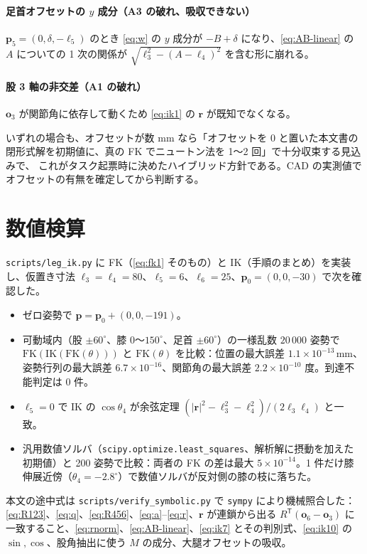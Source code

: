 \documentclass[a4paper,11pt]{ltjsarticle}
\newcommand{\bp}{\boldsymbol{p}}\newcommand{\bo}{\boldsymbol{o}}\newcommand{\br}{\boldsymbol{r}}
\newcommand{\T}{^{\mathsf T}}
\begin{document}
\paragraph{足首オフセットの $y$ 成分（A3 の破れ、吸収できない）}
$\bp_5=(0,\delta,-\ell_5)$ のとき \eqref{eq:w} の $y$ 成分が $-B+\delta$ になり、\eqref{eq:AB-linear} の $A$ についての 1 次の関係が $\sqrt{\ell_3^2-(A-\ell_4)^2}$ を含む形に崩れる。

\paragraph{股 3 軸の非交差（A1 の破れ）}
$\bo_3$ が関節角に依存して動くため \eqref{eq:ik1} の $\br$ が既知でなくなる。

いずれの場合も、オフセットが数 mm なら「オフセットを 0 と置いた本文書の閉形式解を初期値に、真の FK でニュートン法を 1〜2 回」で十分収束する見込みで、
これがタスク起票時に決めたハイブリッド方針である。CAD の実測値でオフセットの有無を確定してから判断する。

\section{数値検算}\label{sec:numeric}
\texttt{scripts/leg\_ik.py} に FK（\eqref{eq:fk1} そのもの）と IK（手順のまとめ）を実装し、仮置き寸法 $\ell_3=\ell_4=80$、$\ell_5=6$、$\ell_6=25$、$\bp_0=(0,0,-30)$ で次を確認した。
\begin{itemize}
\item ゼロ姿勢で $\bp=\bp_0+(0,0,-191)$。
\item 可動域内（股 $\pm60^\circ$、膝 $0$〜$150^\circ$、足首 $\pm60^\circ$）の一様乱数 $20\,000$ 姿勢で $\mathrm{FK}(\mathrm{IK}(\mathrm{FK}(\theta)))$ と $\mathrm{FK}(\theta)$ を比較：位置の最大誤差 $1.1\times10^{-13}\,\mathrm{mm}$、姿勢行列の最大誤差 $6.7\times10^{-16}$、関節角の最大誤差 $2.2\times10^{-10}$ 度。到達不能判定は 0 件。
\item $\ell_5=0$ で IK の $\cos\theta_4$ が余弦定理 $(|\br|^2-\ell_3^2-\ell_4^2)/(2\ell_3\ell_4)$ と一致。
\item 汎用数値ソルバ（\texttt{scipy.optimize.least\_squares}、解析解に摂動を加えた初期値）と 200 姿勢で比較：両者の FK の差は最大 $5\times10^{-14}$。1 件だけ膝伸展近傍（$\theta_4=-2.8^\circ$）で数値ソルバが反対側の膝の枝に落ちた。
\end{itemize}
本文の途中式は \texttt{scripts/verify\_symbolic.py} で \texttt{sympy} により機械照合した：\eqref{eq:R123}、\eqref{eq:q}、\eqref{eq:R456}、\eqref{eq:a}--\eqref{eq:r}、$\br$ が連鎖から出る $R\T(\bo_6-\bo_3)$ に一致すること、\eqref{eq:rnorm}、\eqref{eq:AB-linear}、\eqref{eq:ik7} とその判別式、\eqref{eq:ik10} の $\sin,\cos$、股角抽出に使う $M$ の成分、大腿オフセットの吸収。
\end{document}
